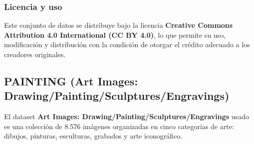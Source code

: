\subsubsection{Licencia y uso}
Este conjunto de datos se distribuye bajo la licencia
\textbf{Creative Commons Attribution 4.0 International (CC BY 4.0)}, lo que permite su uso, modificación y distribución
con la condición de otorgar el crédito adecuado a los creadores originales.


\subsection{PAINTING (Art Images: Drawing/Painting/Sculptures/Engravings)}\label{subsec:painting}
El dataset \textbf{Art Images: Drawing/Painting/Sculptures/Engravings} usado es una colección de 8.576
imágenes organizadas en cinco categorías de arte: dibujos, pinturas, esculturas, grabados y arte iconográfico.

